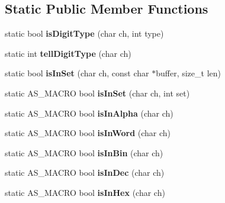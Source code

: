 \subsection*{Static Public Member Functions}
\begin{DoxyCompactItemize}
\item 
\mbox{\label{class_lexical_parser_adaae17b8e4528173b5edca9757bf8a35}} 
static bool {\bfseries is\+Digit\+Type} (char ch, int type)
\item 
\mbox{\label{class_lexical_parser_ae38e8e58f3bf079f4a1d25af4b97700f}} 
static int {\bfseries tell\+Digit\+Type} (char ch)
\item 
\mbox{\label{class_lexical_parser_a4b92d70911a3862887a33e548f35c0a8}} 
static bool {\bfseries is\+In\+Set} (char ch, const char $\ast$buffer, size\+\_\+t len)
\item 
\mbox{\label{class_lexical_parser_a3f74716c7ead86d0b9b4a8dcead9b2d7}} 
static A\+S\+\_\+\+M\+A\+C\+RO bool {\bfseries is\+In\+Set} (char ch, int set)
\item 
\mbox{\label{class_lexical_parser_a31a848d15e17721efb8fc210440ecb7b}} 
static A\+S\+\_\+\+M\+A\+C\+RO bool {\bfseries is\+In\+Alpha} (char ch)
\item 
\mbox{\label{class_lexical_parser_a7c35e1a08076985dab998a01f47a6619}} 
static A\+S\+\_\+\+M\+A\+C\+RO bool {\bfseries is\+In\+Word} (char ch)
\item 
\mbox{\label{class_lexical_parser_a10c8d5a5210e7ee7ec2f8e4703356a7b}} 
static A\+S\+\_\+\+M\+A\+C\+RO bool {\bfseries is\+In\+Bin} (char ch)
\item 
\mbox{\label{class_lexical_parser_af87abd2e2d59a7f4a541293a80b99a0e}} 
static A\+S\+\_\+\+M\+A\+C\+RO bool {\bfseries is\+In\+Dec} (char ch)
\item 
\mbox{\label{class_lexical_parser_a868e7cc1c5afe8423332e376a865630f}} 
static A\+S\+\_\+\+M\+A\+C\+RO bool {\bfseries is\+In\+Hex} (char ch)
\item 

\end{DoxyCompactItemize}
